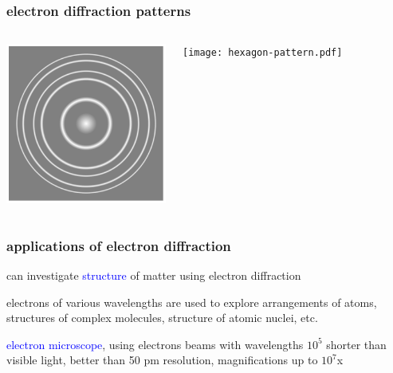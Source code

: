 \documentclass[12pt,xcolor=svgnames,handout]{beamer}
\newcommand{\tightframetitle}[1]{ %
\frametitle{#1}\vspace{-.6\baselineskip}}
\begin{document}
\begin{frame}
	\tightframetitle{electron diffraction patterns}
	
	\begin{columns}[c]
		\begin{block}{}
			\centering
			
			\includegraphics[height=150pt]{ring-pattern.pdf}
			
		\end{block}
		
		\column{0.5\textwidth}
		\begin{block}{}
			\centering
			\texttt{[image: hexagon-pattern.pdf]}
		\end{block}
	\end{columns}
	
\end{frame}
\begin{frame}
	\tightframetitle{applications of electron diffraction}
	
	\begin{block}{}
		can investigate \textcolor{blue}{structure} of matter using electron diffraction
	\end{block}
	
	\begin{block}{}
		electrons of various wavelengths are used to explore arrangements of atoms, structures of complex molecules, structure of atomic nuclei, etc.
	\end{block}
	
	\begin{block}{}
		\textcolor{blue}{electron microscope}, using electrons beams with wavelengths $10^5$ shorter than visible light, better than 50 pm resolution,  magnifications up to $10^7$x
	\end{block}
	
\end{frame}

\end{document}
